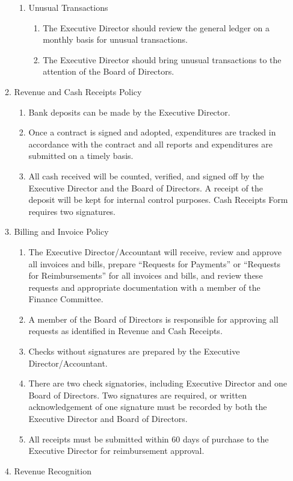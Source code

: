 \documentclass{article}
\begin{document}
\begin{enumerate}
\begin{enumerate}
\begin{enumerate}
\item Unusual Transactions
\begin{enumerate}
\item The Executive Director should review the general ledger on a monthly basis for unusual transactions. 
\item The Executive Director should bring unusual transactions to the attention of the Board of Directors.
\end{enumerate}
\end{enumerate}
\item Revenue and Cash Receipts Policy
\begin{enumerate}
\item Bank deposits can be made by the Executive Director.
\item Once a contract is signed and adopted, expenditures are tracked in accordance with the contract and all reports and expenditures are submitted on a timely basis.
\item All cash received will be counted, verified, and signed off by the Executive Director and the Board of Directors. A receipt of the deposit will be kept for internal control purposes. Cash Receipts Form requires two signatures.
\end{enumerate}
\item Billing and Invoice Policy
\begin{enumerate}
\item The Executive Director/Accountant will receive, review and approve all invoices and bills, prepare “Requests for Payments” or “Requests for Reimbursements” for all invoices and bills, and review these requests and appropriate documentation with a member of the Finance Committee.
\item A member of the Board of Directors is responsible for approving all requests as identified in Revenue and Cash Receipts.
\item Checks without signatures are prepared by the Executive Director/Accountant. 
\item There are two check signatories, including Executive Director and one Board of Directors. Two signatures are required, or written acknowledgement of one signature must be recorded by both the Executive Director and Board of Directors.
\item All receipts must be submitted within 60 days of purchase to the Executive Director for reimbursement approval.
\end{enumerate}
\item Revenue Recognition

\end{enumerate}
\end{enumerate}
\end{document}
